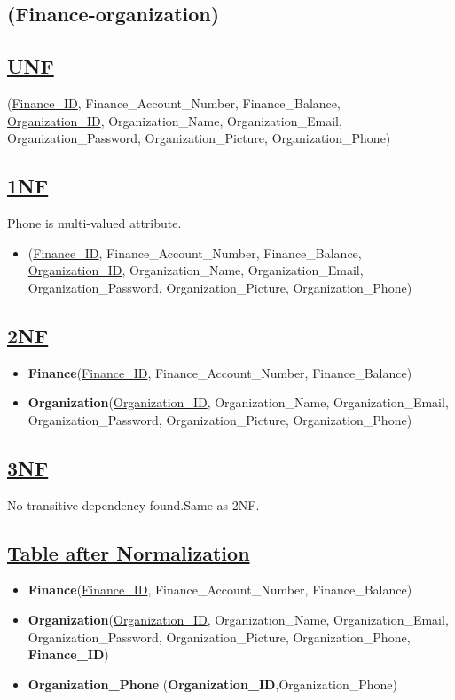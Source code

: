 \subsection{\texorpdfstring{\centering (Finance-organization)}{(Finance-organization)}}

\subsection*{\underline{UNF}}

(\underline{Finance\_ID}, Finance\_Account\_Number, Finance\_Balance,\\
\underline{Organization\_ID}, Organization\_Name, Organization\_Email, Organization\_Password, Organization\_Picture, Organization\_Phone)

\subsection*{\underline{1NF}}
Phone is multi-valued attribute.
\vskip 0.2in

\begin{itemize}
    \item
          (\underline{Finance\_ID}, Finance\_Account\_Number, Finance\_Balance,\\
          \underline{Organization\_ID}, Organization\_Name, Organization\_Email, Organization\_Password, Organization\_Picture, Organization\_Phone)
\end{itemize}

\subsection*{\underline{2NF}}
\begin{itemize}
    \item \textbf{Finance}(\underline{Finance\_ID}, Finance\_Account\_Number, Finance\_Balance)
    \item \textbf{Organization}(\underline{Organization\_ID}, Organization\_Name, Organization\_Email, Organization\_Password, Organization\_Picture, Organization\_Phone)
\end{itemize}

\subsection*{\underline{3NF}}
No transitive dependency found.Same as 2NF.

\subsection*{\underline{Table after Normalization}}
\begin{itemize}
    \item \textbf{Finance}(\underline{Finance\_ID}, Finance\_Account\_Number, Finance\_Balance)
    \item \textbf{Organization}(\underline{Organization\_ID}, Organization\_Name, Organization\_Email, Organization\_Password, Organization\_Picture, Organization\_Phone, \textbf{Finance\_ID})
    \item \textbf{Organization\_Phone} (\textbf{Organization\_ID},{Organization\_Phone})
\end{itemize}

\clearpage